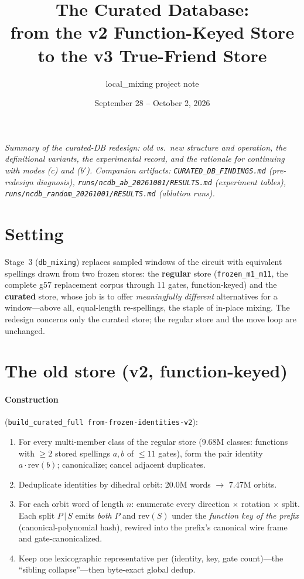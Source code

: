 \documentclass[11pt]{article}
\title{The Curated Database:\\ from the v2 Function-Keyed Store to the v3 True-Friend Store}
\author{local\_mixing project note}
\date{September 28 -- October 2, 2026}
\newcommand{\code}[1]{\texttt{#1}}
\begin{document}
\maketitle

\noindent\emph{Summary of the curated-DB redesign: old vs.\ new structure and
operation, the definitional variants, the experimental record, and the
rationale for continuing with modes (c) and (b$'$). Companion artifacts:
\code{CURATED\_DB\_FINDINGS.md} (pre-redesign diagnosis),
\code{runs/ncdb\_ab\_20261001/RESULTS.md} (experiment tables),
\code{runs/ncdb\_random\_20261001/RESULTS.md} (ablation runs).}

\section{Setting}

Stage~3 (\code{db\_mixing}) replaces sampled windows of the circuit with
equivalent spellings drawn from two frozen stores: the \textbf{regular} store
(\code{frozen\_m1\_m11}, the complete g57 replacement corpus through 11
gates, function-keyed) and the \textbf{curated} store, whose job is to offer
\emph{meaningfully different} alternatives for a window---above all,
equal-length re-spellings, the staple of in-place mixing. The redesign
concerns only the curated store; the regular store and the move loop are
unchanged.

\section{The old store (v2, function-keyed)}

\paragraph{Construction} (\code{build\_curated\_full from-frozen-identities-v2}):
\begin{enumerate}[nosep]
\item For every multi-member class of the regular store (9.68M classes:
functions with $\ge 2$ stored spellings $a,b$ of $\le 11$ gates), form the
pair identity $a\cdot\mathrm{rev}(b)$; canonicalize; cancel adjacent
duplicates.
\item Deduplicate identities by dihedral orbit: 20.0M words $\to$ 7.47M
orbits.
\item For each orbit word of length $n$: enumerate every direction $\times$
rotation $\times$ split. Each split $P\,|\,S$ emits \emph{both} $P$ and
$\mathrm{rev}(S)$ under the \emph{function key of the prefix}
(canonical-polynomial hash), rewired into the prefix's canonical wire frame
and gate-canonicalized.
\item Keep one lexicographic representative per (identity, key, gate
count)---the ``sibling collapse''---then byte-exact global dedup.
\end{enumerate}
\end{document}

